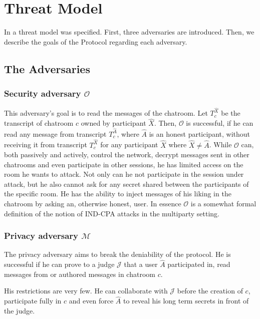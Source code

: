 \chapter{Threat Model}
\label{chapter:threat_model}

\newcommand{\secadv}{$\mathcal{O}$ }
\newcommand{\privadv}{$\mathcal{M}$ }
\newcommand{\conadv}{$\mathcal{T}$ }

In \cite{mpotr} a threat model was specified. First, three adversaries are introduced. Then, we describe the goals of the Protocol regarding each adversary.

\section{The Adversaries}

\subsection{Security adversary $\mathcal{O}$}
This adversary's goal is to read the messages of the chatroom.
Let $T_c^{\hat{X}}$ be the transcript of chatroom $c$ owned by participant $\hat{X}$.
Then, $\mathcal{O}$ is successful, if he can read any message from transcript $T_c^{\hat{A}}$, where $\hat{A}$ is an honest participant, without receiving it from transcript $T_c^{\hat{X}}$ for any participant $\hat{X}$ where $\hat{X} \ne \hat{A}$.
While $\mathcal{O}$ can, both passively and actively, control the network, decrypt messages sent in other chatrooms and even participate in other sessions, he has limited access on the room he wants to attack.
Not only can he not participate in the session under attack, but he also cannot ask for any secret shared between the participants of the specific room.
He has the ability to inject messages of his liking in the chatroom by asking an, otherwise honest, user.
In essence $\mathcal{O}$ is a somewhat formal definition of the notion of IND-CPA attacks in the multiparty setting.

\subsection{Privacy adversary $\mathcal{M}$}

The privacy adversary aims to break the deniability of the protocol.
He is successful if he can prove to a judge $\mathcal{J}$ that a user $\hat{A}$ participated in, read messages from or authored messages in chatroom $c$.

His restrictions are very few.
He can collaborate with $\mathcal{J}$ before the creation of $c$, participate fully in $c$ and even force $\hat{A}$ to reveal his long term secrets in front of the judge.

